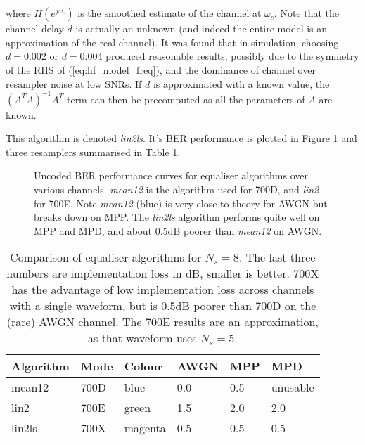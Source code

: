 \documentclass{article}
\begin{document}
where $\overline{H(e^{j \omega_c})}$ is the smoothed estimate of the channel at $\omega_c$.  Note that the channel delay $d$ is actually an unknown (and indeed the entire model is an approximation of the real channel). It was found that in simulation, choosing $d=0.002$ or $d=0.004$ produced reasonable results, possibly due to the symmetry of the RHS of (\ref{eq:hf_model_freq}), and the dominance of channel over resampler noise at low SNRs. If $d$ is approximated with a known value, the $(A^TA)^{-1}A^T$ term can then be precomputed as all the parameters of $A$ are known.

This algorithm is denoted \emph{lin2ls}.  It's BER performance is plotted in Figure \ref{fig:equaliser_curves} and three resamplers summarised in Table \ref{tab:resampler_summary}.

\begin{figure}[H]
\caption{Uncoded BER performance curves for equaliser algorithms over various channels. \emph{mean12} is the algorithm used for 700D, and \emph{lin2} for 700E.  Note \emph{mean12} (blue) is very close to theory for AWGN but breaks down on MPP.  The \emph{lin2ls} algorithm performs quite well on MPP and MPD, and about 0.5dB poorer than \emph{mean12} on AWGN.}
\label{fig:equaliser_curves}
\begin{center}

\end{center}
\end{figure}

\begin{table}[h]
\centering
\begin{tabular}{l l l l l l }
 \hline
 Algorithm & Mode & Colour & AWGN & MPP & MPD \\
 \hline
 mean12 & 700D & blue & 0.0 & 0.5 & unusable \\
 lin2 & 700E & green & 1.5 & 2.0 & 2.0 \\
 lin2ls & 700X & magenta & 0.5 & 0.5 & 0.5 \\
 \hline
\end{tabular}
\caption{Comparison of equaliser algorithms for $N_s=8$. The last three numbers are implementation loss in dB, smaller is better.  700X has the advantage of low implementation loss across channels with a single waveform, but is 0.5dB poorer than 700D on the (rare) AWGN channel.  The 700E results are an approximation, as that waveform uses $N_s=5$. }
\label{tab:resampler_summary}
\end{table}
\end{document}
